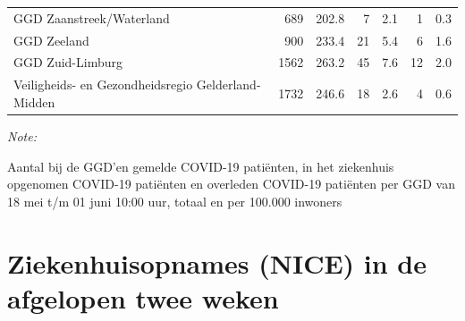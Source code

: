 \documentclass[
  english,
  man,floatsintext]{apa6}
\begin{document}
\begin{table}
\begin{threeparttable}
\begin{tabular}{lrrrrrr}
GGD Zaanstreek/Waterland & 689 & 202.8 & 7 & 2.1 & 1 & 0.3\\
GGD Zeeland & 900 & 233.4 & 21 & 5.4 & 6 & 1.6\\
GGD Zuid-Limburg & 1562 & 263.2 & 45 & 7.6 & 12 & 2.0\\
Veiligheids- en Gezondheidsregio Gelderland-Midden & 1732 & 246.6 & 18 & 2.6 & 4 & 0.6\\
\bottomrule
\end{tabular}
\begin{tablenotes}
\item \textit{Note: } 
\item Aantal bij de GGD’en gemelde COVID-19 patiënten, in het ziekenhuis opgenomen COVID-19 patiënten en overleden COVID-19 patiënten per GGD van 18 mei t/m 01 juni 10:00 uur, totaal en per 100.000 inwoners
\end{tablenotes}
\end{threeparttable}
\endgroup{}
\end{table}

\newpage

\hypertarget{ziekenhuisopnames-nice-in-de-afgelopen-twee-weken}{%
\section{Ziekenhuisopnames (NICE) in de afgelopen twee weken}\label{ziekenhuisopnames-nice-in-de-afgelopen-twee-weken}}
\end{document}
